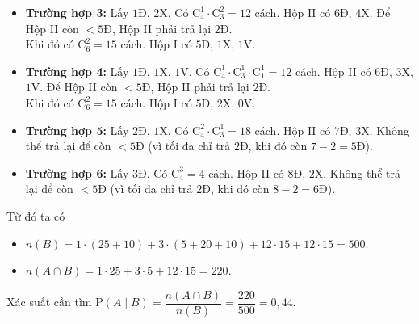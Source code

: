 \begin{ex}
{\begin{itemize}
\begin{itemize}
				\item Hộp II trả lại $2$Đ. Có $\mathrm{C}_5^2 = 10$ cách. Khi đó Hộp I có $6$Đ, $1$X, $0$V.
			\end{itemize}
			\item \textbf{Trường hợp 3:} Lấy $1$Đ, $2$X. Có $\mathrm{C}_4^1 \cdot \mathrm{C}_3^2 = 12$ cách. Hộp II có $6$Đ, $4$X. Để Hộp II còn $<5$Đ, Hộp II phải trả lại $2$Đ.\\
			Khi đó có $\mathrm{C}_6^2 = 15$ cách. Hộp I có $5$Đ, $1$X, $1$V.
			\item \textbf{Trường hợp 4:} Lấy $1$Đ, $1$X, $1$V. Có $\mathrm{C}_4^1 \cdot \mathrm{C}_3^1\cdot \mathrm{C}_1^1 = 12$ cách. Hộp II có $6$Đ, $3$X, $1$V. Để Hộp II còn $<5$Đ, Hộp II phải trả lại $2$Đ.\\
			Khi đó có $\mathrm{C}_6^2 = 15$ cách. Hộp I có $5$Đ, $2$X, $0$V.
			\item \textbf{Trường hợp 5:} Lấy $2$Đ, $1$X. Có $\mathrm{C}_4^2 \cdot \mathrm{C}_3^1 = 18$ cách. Hộp II có $7$Đ, $3$X. Không thể trả lại để còn $<5$Đ (vì tối đa chỉ trả $2$Đ, khi đó còn $7-2=5$Đ).
			\item \textbf{Trường hợp 6:} Lấy $3$Đ. Có $\mathrm{C}_4^3 = 4$ cách. Hộp II có $8$Đ, $2$X. Không thể trả lại để còn $<5$Đ (vì tối đa chỉ trả $2$Đ, khi đó còn $8-2=6$Đ).
		\end{itemize}
		Từ đó ta có
		\begin{itemize}
			\item $n(B)=1\cdot (25+10)+3\cdot (5+20+10)+12\cdot 15+12\cdot 15=500$.
			\item $n(A\cap B)=1\cdot 25+3\cdot 5+12\cdot 15=220$.
		\end{itemize}
		Xác suất cần tìm $\mathrm{P}(A\mid B) = \dfrac{n(A \cap B)}{n(B)}=\dfrac{220}{500}=0{,}44$.
	}
\end{ex}

